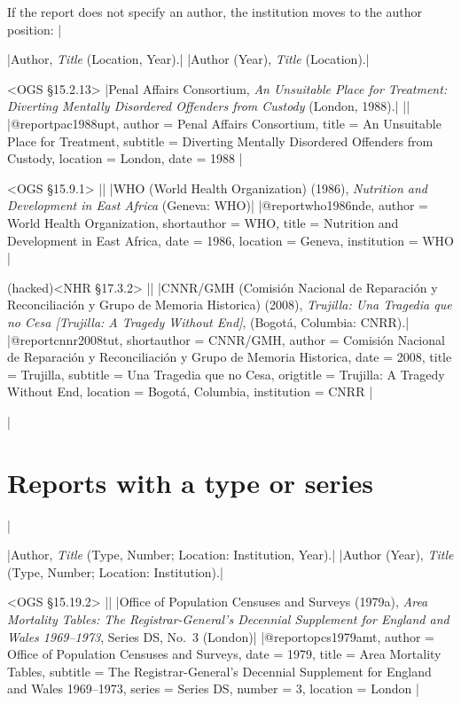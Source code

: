 \documentclass[extrafontsizes,11pt,a4paper,oneside]{memoir}
\begin{document}
If the report does not specify an author, the institution moves to the author position:
|

\specs
|Author, \emph{Title} (Location, Year).|%
|Author (Year), \emph{Title} (Location).|

\bibexample<OGS \S15.2.13>
|Penal Affairs Consortium, \emph{An Unsuitable Place for Treatment: Diverting Mentally Disordered Offenders from Custody} (London, 1988).|%
||%
|@report{pac1988upt,
  author = {{Penal Affairs Consortium}},
  title = {An Unsuitable Place for Treatment},
  subtitle = {Diverting Mentally Disordered Offenders from Custody},
  location = {London},
  date = {1988}
}|

\bibexample<OGS \S15.9.1>
||%
|WHO (World Health Organization) (1986), \emph{Nutrition and Development in East Africa} (Geneva: WHO)|%
|@report{who1986nde,
  author = {{World Health Organization}},
  shortauthor = {WHO},
  title = {Nutrition and Development in {East Africa}},
  date = {1986},
  location = {Geneva},
  institution = {WHO}
}|

\bibexample(hacked)<NHR \S17.3.2>
||%
|CNNR/GMH (Comisión Nacional de Reparación y Reconciliación y Grupo de Memoria Historica) (2008), \emph{Trujilla: Una Tragedia que no Cesa [Trujilla: A Tragedy Without End]}, (Bogotá, Columbia: CNRR).|%
|@report{cnnr2008tut,
  shortauthor = {CNNR/GMH},
  author = {{Comisión Nacional de Reparación y Reconciliación y Grupo de Memoria Historica}},
  date = {2008},
  title = {Trujilla},
  subtitle = {Una Tragedia que no Cesa},
  origtitle = {{Trujilla:} {A} Tragedy Without End},
  location = {Bogotá, Columbia},
  institution = {CNRR}
}|

\todoc|
\section{Reports with a type or series}
|

\specs
|Author, \emph{Title} (Type, Number; Location: Institution, Year).|%
|Author (Year), \emph{Title} (Type, Number; Location: Institution).|

\bibexample<OGS \S15.19.2>
||%
|Office of Population Censuses and Surveys (1979a), \emph{Area Mortality Tables: The Registrar-General's Decennial Supplement for England and Wales 1969–1973}, Series DS, No.~3 (London)|%
|@report{opcs1979amt,
  author = {{Office of Population Censuses and Surveys}},
  date = {1979},
  title = {Area Mortality Tables},
  subtitle = {The Registrar-General's Decennial Supplement for England and Wales 1969–1973},
  series = {Series DS},
  number = {3},
  location = {London}
}|
\end{document}
